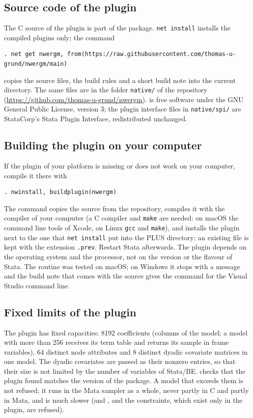 \subsection{Source code of the plugin}

The C source of the plugin is part of the package. \texttt{net install} installs the compiled plugins only; the command
\begin{lstlisting}
. net get nwergm, from(https://raw.githubusercontent.com/thomas-u-grund/nwergm/main)
\end{lstlisting}
copies the source files, the build rules and a short build note into the current directory. The same files are in the folder \texttt{native/} of the repository (\url{https://github.com/thomas-u-grund/nwergm}). \nwergm{} is free software under the GNU General Public License, version 3; the plugin interface files in \texttt{native/spi/} are StataCorp's Stata Plugin Interface, redistributed unchanged.

\subsection{Building the plugin on your computer}

If the plugin of your platform is missing or does not work on your computer, compile it there with
\begin{lstlisting}
. nwinstall, buildplugin(nwergm)
\end{lstlisting}
The command copies the source from the repository, compiles it with the compiler of your computer (a C compiler and \texttt{make} are needed: on macOS the command line tools of Xcode, on Linux \texttt{gcc} and \texttt{make}), and installs the plugin next to the one that \texttt{net install} put into the PLUS directory; an existing file is kept with the extension \texttt{.prev}. Restart Stata afterwards. The plugin depends on the operating system and the processor, not on the version or the flavour of Stata. The routine was tested on macOS; on Windows it stops with a message and the build note that comes with the source gives the command for the Visual Studio command line.

\subsection{Fixed limits of the plugin}

The plugin has fixed capacities: 8192 coefficients (columns of the model; a model with more than 256 receives its term table and returns its sample in frame variables), 64 distinct node attributes and 8 distinct dyadic covariate matrices in one model. The dyadic covariates are passed as their nonzero entries, so that their size is not limited by the number of variables of Stata/BE. \nwergm{} checks that the plugin found matches the version of the package. A model that exceeds them is not refused; it runs in the Mata sampler as a whole, never partly in C and partly in Mata, and is much slower (and ,  and the constraints, which exist only in the plugin, are refused).

